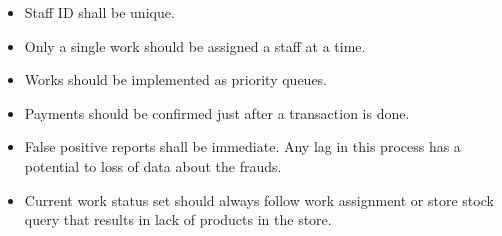 \begin{itemize}
    \item Staff ID shall be unique.
    \item Only a single work should be assigned a staff at a time.
    \item Works should be implemented as priority queues.
    \item Payments should be confirmed just after a transaction is done.
    \item False positive reports shall be immediate. Any lag in this process has a potential to loss of data about the frauds.
    \item Current work status set should always follow work assignment or store stock query that results in lack of products in the store.
\end{itemize}

